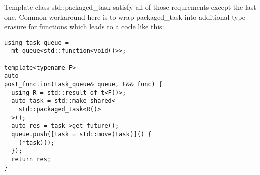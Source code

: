\documentclass[ebook,openany,10pt,oneside,final]{memoir}
\begin{document}
Template class std::packaged_task satisfy all of those requrements except the last one. Common
workaround here is to wrap packaged_task into additional type-erasure for functions which leads to a
code like this:

\begin{lstlisting}
using task_queue =
  mt_queue<std::function<void()>>;

template<typename F>
auto
post_function(task_queue& queue, F&& func) {
  using R = std::result_of_t<F()>;
  auto task = std::make_shared<
    std::packaged_task<R()>
  >();
  auto res = task->get_future();
  queue.push([task = std::move(task)]() {
    (*task)();
  });
  return res;
}
\end{lstlisting}
\end{document}
